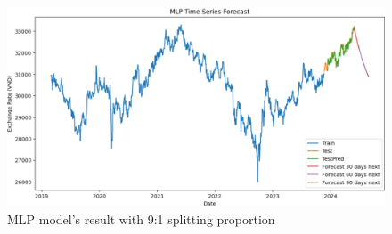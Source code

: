 \documentclass{ieeeojies}
\begin{document}
\begin{figure}[H]
  \centering
  \begin{minipage}{0.8\linewidth}
    \centering
    \includegraphics[width=\linewidth]{MLP/mlp_gbp_91.png}
    \caption{MLP model's result with 9:1 splitting proportion}
    \label{fig25}
  \end{minipage}
\end{figure}
\end{document}
